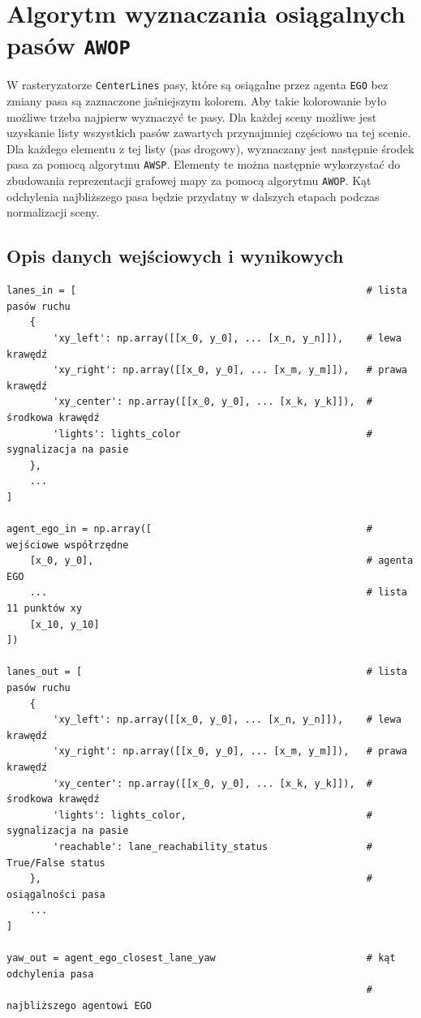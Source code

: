 \newpage

\section{Algorytm wyznaczania osiągalnych pasów \texttt{AWOP}}

W rasteryzatorze \texttt{CenterLines} pasy, które są osiągalne przez agenta \texttt{EGO} bez zmiany pasa są zaznaczone jaśniejszym kolorem. Aby takie kolorowanie było możliwe trzeba najpierw wyznaczyć te pasy. Dla każdej sceny możliwe jest uzyskanie listy wszystkich pasów zawartych przynajmniej częściowo na tej scenie. Dla każdego elementu z tej listy (pas drogowy), wyznaczany jest następnie środek pasa za pomocą algorytmu \texttt{AWSP}. Elementy te można następnie wykorzystać do zbudowania reprezentacji grafowej mapy za pomocą algorytmu \texttt{AWOP}. Kąt odchylenia najbliższego pasa będzie przydatny w dalszych etapach podczas normalizacji sceny.

\subsection{Opis danych wejściowych i wynikowych}

\vspace{0em}
\begin{verbatim}
lanes_in = [                                                  # lista pasów ruchu
    {
        'xy_left': np.array([[x_0, y_0], ... [x_n, y_n]]),    # lewa krawędź
        'xy_right': np.array([[x_0, y_0], ... [x_m, y_m]]),   # prawa krawędź
        'xy_center': np.array([[x_0, y_0], ... [x_k, y_k]]),  # środkowa krawędź
        'lights': lights_color                                # sygnalizacja na pasie
    },
    ...
]

agent_ego_in = np.array([                                     # wejściowe współrzędne
    [x_0, y_0],                                               # agenta EGO
    ...                                                       # lista 11 punktów xy
    [x_10, y_10]
])

lanes_out = [                                                 # lista pasów ruchu
    {
        'xy_left': np.array([[x_0, y_0], ... [x_n, y_n]]),    # lewa krawędź
        'xy_right': np.array([[x_0, y_0], ... [x_m, y_m]]),   # prawa krawędź
        'xy_center': np.array([[x_0, y_0], ... [x_k, y_k]]),  # środkowa krawędź
        'lights': lights_color,                               # sygnalizacja na pasie
        'reachable': lane_reachability_status                 # True/False status
    },                                                        # osiągalności pasa
    ...
]

yaw_out = agent_ego_closest_lane_yaw                          # kąt odchylenia pasa
                                                              # najbliższego agentowi EGO
\end{verbatim}

